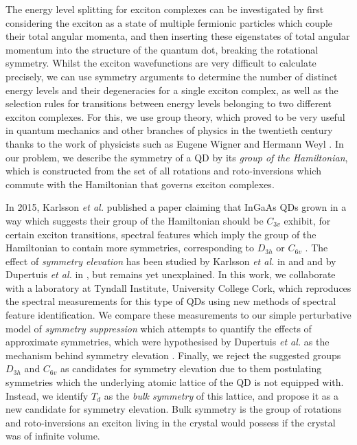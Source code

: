 \documentclass[12pt]{article}
\numberwithin{equation}{section}
\begin{document}
The energy level splitting for exciton complexes can be investigated by first considering the exciton as a state of multiple fermionic particles which couple their total angular momenta, and then inserting these eigenstates of total angular momentum into the structure of the quantum dot, breaking the rotational symmetry. Whilst the exciton wavefunctions are very difficult to calculate precisely, we can use symmetry arguments to determine the number of distinct energy levels and their degeneracies for a single exciton complex, as well as the selection rules for transitions between energy levels belonging to two different exciton complexes. For this, we use group theory, which proved to be very useful in quantum mechanics and other branches of physics in the twentieth century thanks to the work of physicists such as Eugene Wigner and Hermann Weyl \cite{wightman}. In our problem, we describe the symmetry of a QD by its \textit{group of the Hamiltonian}, which is constructed from the set of all rotations and roto-inversions which commute with the Hamiltonian that governs exciton complexes.

In 2015, Karlsson \textit{et al.} published a paper claiming that InGaAs QDs grown in a way which suggests their group of the Hamiltonian should be $C_{3v}$ exhibit, for certain exciton transitions, spectral features which imply the group of the Hamiltonian to contain more symmetries, corresponding to $D_{3h}$ or $C_{6v}$ \cite{karlsson}. The effect of \textit{symmetry elevation} has been studied by Karlsson \textit{et al.} in \cite{karlsson} and \cite{karlsson_2010} and by Dupertuis \textit{et al.} in \cite{dupertuis}, but remains yet unexplained. In this work, we collaborate with a laboratory at Tyndall Institute, University College Cork, which reproduces the spectral measurements for this type of QDs using new methods of spectral feature identification. We compare these measurements to our simple perturbative model of \textit{symmetry suppression} which attempts to quantify the effects of approximate symmetries, which were hypothesised by Dupertuis \textit{et al.} as the mechanism behind symmetry elevation \cite[p.~2]{dupertuis}. Finally, we reject the suggested groups $D_{3h}$ and $C_{6v}$ as candidates for symmetry elevation due to them postulating symmetries which the underlying atomic lattice of the QD is not equipped with. Instead, we identify $T_d$ as the \textit{bulk symmetry} of this lattice, and propose it as a new candidate for symmetry elevation. Bulk symmetry is the group of rotations and roto-inversions an exciton living in the crystal would possess if the crystal was of infinite volume.
\end{document}

